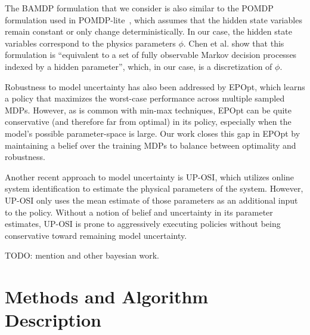 \documentclass{article}
\begin{document}
%
The BAMDP formulation that we consider is also similar to the POMDP formulation used in POMDP-lite~\cite{chen2016pomdp}, which assumes that the hidden state variables remain constant or only change deterministically.
In our case, the hidden state variables correspond to the physics parameters $\phi$.
Chen et al. show that this formulation is ``equivalent to a set of fully observable Markov decision processes indexed by a hidden parameter'', which, in our case, is a discretization of $\phi$.

Robustness to model uncertainty has also been addressed by EPOpt\cite{rajeswaran2016epopt}, which learns a policy that maximizes the worst-case performance across multiple sampled MDPs.
However, as is common with min-max techniques, EPOpt can be quite conservative (and therefore far from optimal) in its policy, especially when the model's possible parameter-space is large.
Our work closes this gap in EPOpt by maintaining a belief over the training MDPs to balance between optimality and robustness.

Another recent approach to model uncertainty is UP-OSI\cite{yu2017uposi}, which utilizes online system identification to estimate the physical parameters of the system.
However, UP-OSI only uses the mean estimate of those parameters as an additional input to the policy.
Without a notion of belief and uncertainty in its parameter estimates, UP-OSI is prone to aggressively executing policies without being conservative toward remaining model uncertainty.

TODO: mention \cite{guez2014bayes} and other bayesian work.

\section{Methods and Algorithm Description}
\end{document}
